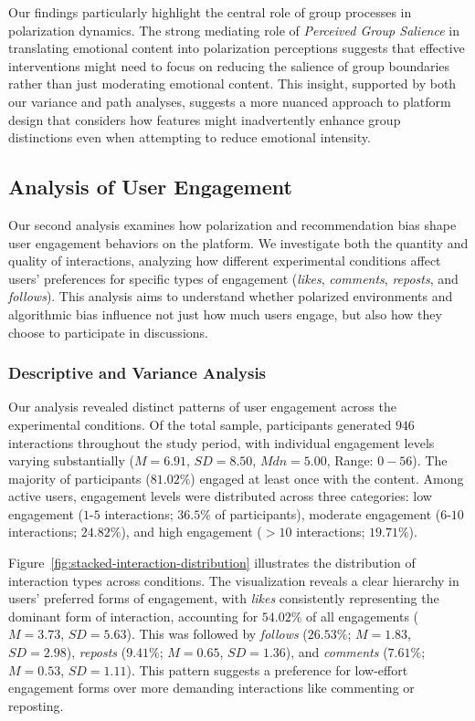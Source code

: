 Our findings particularly highlight the central role of group processes in polarization dynamics. The strong mediating role of \emph{Perceived Group Salience} in translating emotional content into polarization perceptions suggests that effective interventions might need to focus on reducing the salience of group boundaries rather than just moderating emotional content. This insight, supported by both our variance and path analyses, suggests a more nuanced approach to platform design that considers how features might inadvertently enhance group distinctions even when attempting to reduce emotional intensity.

\subsection{Analysis of User Engagement}

Our second analysis examines how polarization and recommendation bias shape user engagement behaviors on the platform. We investigate both the quantity and quality of interactions, analyzing how different experimental conditions affect users' preferences for specific types of engagement (\emph{likes}, \emph{comments}, \emph{reposts}, and \emph{follows}). This analysis aims to understand whether polarized environments and algorithmic bias influence not just how much users engage, but also how they choose to participate in discussions.

\subsubsection{Descriptive and Variance Analysis}




Our analysis revealed distinct patterns of user engagement across the experimental conditions. Of the total sample, participants generated $946$ interactions throughout the study period, with individual engagement levels varying substantially ($M = 6.91$, $SD = 8.50$, $Mdn = 5.00$, Range: $0-56$). The majority of participants ($81.02\%$) engaged at least once with the content. Among active users, engagement levels were distributed across three categories: low engagement ($1$-$5$ interactions; $36.5\%$ of participants), moderate engagement ($6$-$10$ interactions; $24.82\%$), and high engagement ($>10$ interactions; $19.71\%$).


Figure~\ref{fig:stacked-interaction-distribution} illustrates the distribution of interaction types across conditions. The visualization reveals a clear hierarchy in users' preferred forms of engagement, with \emph{likes} consistently representing the dominant form of interaction, accounting for $54.02\%$ of all engagements ($M = 3.73$, $SD = 5.63$). This was followed by \emph{follows} ($26.53\%$; $M = 1.83$, $SD = 2.98$), \emph{reposts} ($9.41\%$; $M = 0.65$, $SD = 1.36$), and \emph{comments} ($7.61\%$; $M = 0.53$, $SD = 1.11$). This pattern suggests a preference for low-effort engagement forms over more demanding interactions like commenting or reposting.

